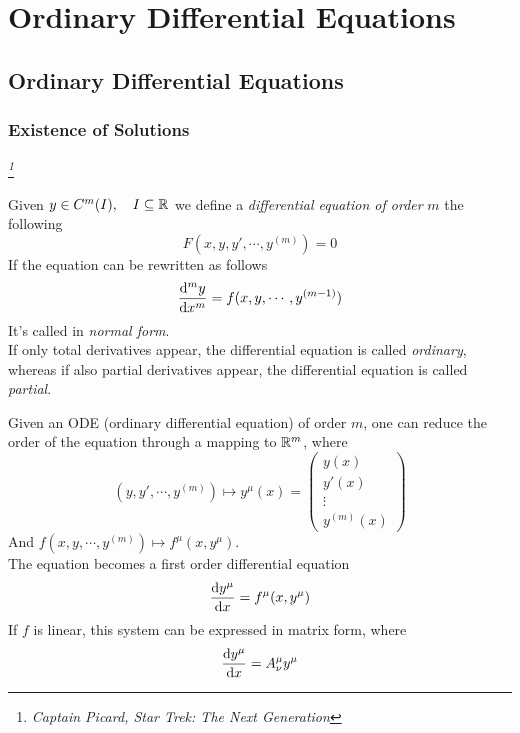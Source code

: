 \documentclass[../complete.tex]{subfiles}
\begin{document}
\chapter{Ordinary Differential Equations}
\section{Ordinary Differential Equations}
\subsection{Existence of Solutions}
\textit{\footnote{\textit{Captain Picard, Star Trek: The Next Generation}}}
\baselineskip
\begin{dfn}
	Given $y\in C^m(I),\quad I\subseteq\mathbb{R}$ we define a \textit{differential equation of order} $m$ the following
	\begin{equation*}
		F(x,y,y',\cdots,y^{(m)})=0
	\end{equation*}
	If the equation can be rewritten as follows
	\begin{equation*}
		\derivative[m]{y}{x}=f(x,y,\cdots,y^{(m-1)})
	\end{equation*}
	It's called in \textit{normal form}.\\
	If only total derivatives appear, the differential equation is called \textit{ordinary}, whereas if also partial derivatives appear, the differential equation is called \textit{partial}.\\
\end{dfn}
\begin{thm}
	Given an ODE (ordinary differential equation) of order $m$, one can reduce the order of the equation through a mapping to $\mathbb{R}^m$, where
	\begin{equation*}
		(y,y',\cdots,y^{(m)})\mapsto y^\mu(x)=\begin{pmatrix}y(x)\\y'(x)\\\vdots\\y^{(m)}(x)\end{pmatrix}
	\end{equation*}
	And $f(x,y,\cdots,y^{(m)})\mapsto f^\mu(x,y^\mu)$.\\
	The equation becomes a first order differential equation
	\begin{equation*}
		\derivative{y^\mu}{x}=f^\mu(x,y^\mu)
	\end{equation*}
	If $f$ is linear, this system can be expressed in matrix form, where
	\begin{equation*}
		\derivative{y^\mu}{x}=A^\mu_\nu y^\mu
	\end{equation*}
\end{thm}
\end{document}
